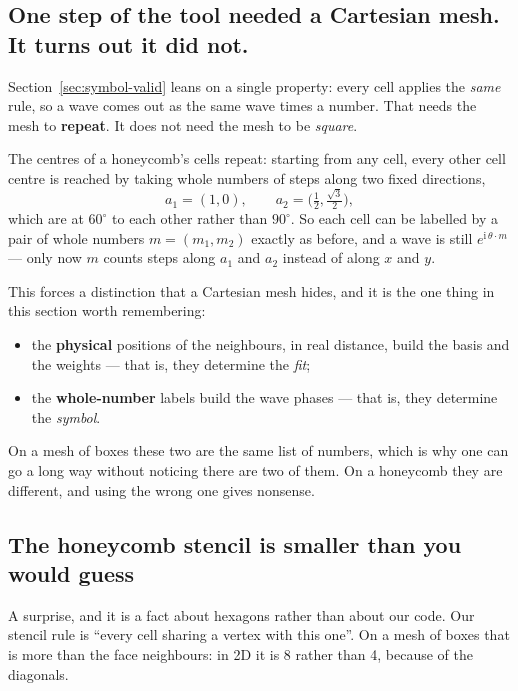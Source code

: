 \documentclass[11pt,a4paper]{article}
\begin{document}
\subsection{One step of the tool needed a Cartesian mesh. It turns out it did not.}

Section~\ref{sec:symbol-valid} leans on a single property: every cell applies the \emph{same}
rule, so a wave comes out as the same wave times a number. That needs the mesh to
\textbf{repeat}. It does not need the mesh to be \emph{square}.

The centres of a honeycomb's cells repeat: starting from any cell, every other cell centre is
reached by taking whole numbers of steps along two fixed directions,
\begin{equation}
  a_1 = (1, 0), \qquad a_2 = \bigl(\tfrac12, \tfrac{\sqrt3}{2}\bigr),
\end{equation}
which are at $60^\circ$ to each other rather than $90^\circ$. So each cell can be labelled by
a pair of whole numbers $m = (m_1, m_2)$ exactly as before, and a wave is still
$e^{\mathrm{i}\,\theta\cdot m}$ --- only now $m$ counts steps along $a_1$ and $a_2$ instead of
along $x$ and $y$.

This forces a distinction that a Cartesian mesh hides, and it is the one thing in this section
worth remembering:

\begin{itemize}
\item the \textbf{physical} positions of the neighbours, in real distance, build the basis and
      the weights --- that is, they determine the \emph{fit};
\item the \textbf{whole-number} labels build the wave phases --- that is, they determine the
      \emph{symbol}.
\end{itemize}

On a mesh of boxes these two are the same list of numbers, which is why one can go a long way
without noticing there are two of them. On a honeycomb they are different, and using the wrong
one gives nonsense.

\subsection{The honeycomb stencil is smaller than you would guess}

A surprise, and it is a fact about hexagons rather than about our code. Our stencil rule is
``every cell sharing a vertex with this one''. On a mesh of boxes that is more than the face
neighbours: in 2D it is 8 rather than 4, because of the diagonals.
\end{document}
